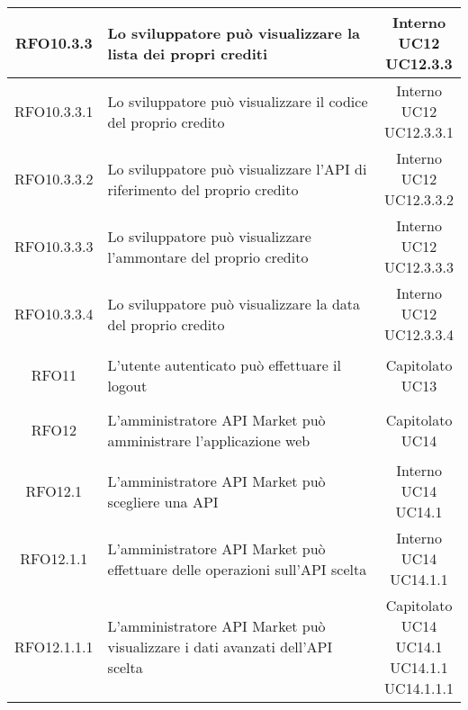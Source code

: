 \begin{longtable}{|c|p{8cm}|c|}
\hypertarget{RFO10.3.3}{RFO10.3.3} & Lo sviluppatore può visualizzare la lista dei propri crediti & \makecell*{Interno\\UC12\\UC12.3.3} \\
\hline

\hypertarget{RFO10.3.3.1}{RFO10.3.3.1} & Lo sviluppatore può visualizzare il codice del proprio credito & \makecell*{Interno\\UC12\\UC12.3.3.1} \\
\hline
\hypertarget{RFO10.3.3.2}{RFO10.3.3.2} & Lo sviluppatore può visualizzare l'API di riferimento del proprio credito & \makecell*{Interno\\UC12\\UC12.3.3.2} \\
\hline
\hypertarget{RFO10.3.3.3}{RFO10.3.3.3} & Lo sviluppatore può visualizzare l'ammontare del proprio credito & \makecell*{Interno\\UC12\\UC12.3.3.3} \\
\hline
\hypertarget{RFO10.3.3.4}{RFO10.3.3.4} & Lo sviluppatore può visualizzare la data del proprio credito & \makecell*{Interno\\UC12\\UC12.3.3.4} \\
\hline

\hypertarget{RFO11}{RFO11} & L'utente autenticato può effettuare il logout & \makecell*{Capitolato\\UC13} \\
\hline

\hypertarget{RFO12}{RFO12} & L'amministratore API Market può amministrare l'applicazione web & \makecell*{Capitolato\\UC14} \\
\hline

\hypertarget{RFO12.1}{RFO12.1} & L'amministratore API Market può scegliere una API & \makecell*{Interno\\UC14\\UC14.1} \\
\hline

\hypertarget{RFO12.1.1}{RFO12.1.1} & L'amministratore API Market può effettuare delle operazioni sull'API scelta & \makecell*{Interno\\UC14\\UC14.1.1} \\
\hline

\hypertarget{RFO12.1.1.1}{RFO12.1.1.1} & L'amministratore API Market può visualizzare i dati avanzati dell'API scelta & \makecell*{Capitolato\\UC14\\UC14.1\\UC14.1.1\\UC14.1.1.1} \\
\hline


\end{longtable}
